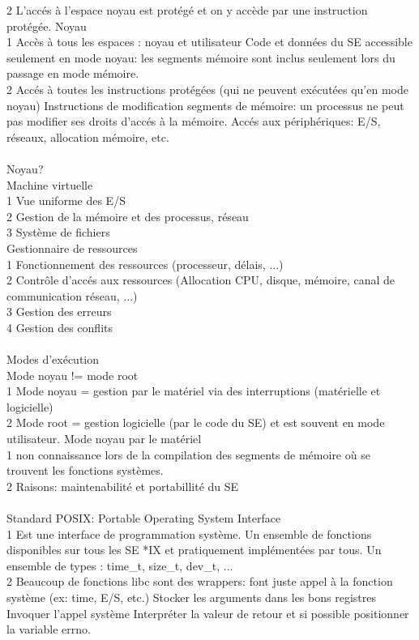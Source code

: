 \documentclass[5pt]{article}
\begin{document}
\begin{scriptsize}
2 L’accés à l’espace noyau est protégé et on y accède par une instruction protégée.
Noyau\\
1 Accès à tous les espaces : noyau et utilisateur Code et données du SE accessible seulement en mode noyau: les segments mémoire sont inclus seulement lors du passage en mode mémoire.\\
2 Accés à toutes les instructions protégées (qui ne peuvent exécutées qu’en mode noyau) Instructions de modification segments de mémoire: un processus ne peut pas modifier ses droits d’accés à la mémoire. Accés aux périphériques: E/S, réseaux, allocation mémoire, etc.\\
\\
Noyau?\\
Machine virtuelle\\
1 Vue uniforme des E/S\\
2 Gestion de la mémoire et des processus, réseau\\
3 Système de fichiers\\
Gestionnaire de ressources\\
1 Fonctionnement des ressources (processeur, délais, ...)\\
2 Contrôle d’accés aux ressources (Allocation CPU, disque, mémoire, canal de communication réseau, ...)\\
3 Gestion des erreurs\\
4 Gestion des conflits\\
\\
Modes d’exécution\\
Mode noyau != mode root \\
1 Mode noyau = gestion par le matériel via des interruptions (matérielle et logicielle)\\
2 Mode root = gestion logicielle (par le code du SE) et est souvent en mode utilisateur.
Mode noyau par le matériel\\
1 non connaissance lors de la compilation des segments de mémoire où se trouvent les fonctions systèmes.\\
2 Raisons: maintenabilité et portabillité du SE\\
\\
Standard POSIX: Portable Operating System Interface\\
1 Est une interface de programmation système. Un ensemble de fonctions disponibles sur tous les SE *IX et pratiquement implémentées par tous. Un ensemble de types : time\_t, size\_t, dev\_t, ...\\
2 Beaucoup de fonctions libc sont des wrappers: font juste appel à la fonction système (ex: time, E/S, etc.) Stocker les arguments dans les bons registres Invoquer l’appel système Interpréter la valeur de retour et si possible positionner la variable errno.\\

\end{scriptsize}
\end{document}
